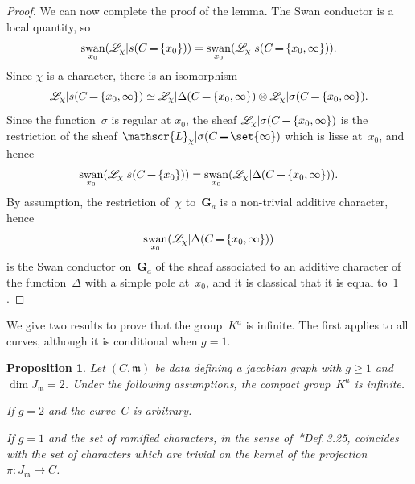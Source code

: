 \documentclass[12pt]{amsart}
\renewcommand{\geq}{\geqslant}
\numberwithin{equation}{section}
\def\setminus{\mathchoice
    {\mathbin{\vrule height .62ex width 1.61ex depth -.38ex}}%
    {\mathbin{\vrule height .62ex width 1.61ex depth -.38ex}}%
    {\mathbin{\vrule height .50ex width 0.85ex depth -.28ex}}%
    {\mathbin{\vrule height .20ex width 0.570ex depth -.24ex}}%
}
\newcommand{\Gg}{\mathbf{G}}
\newcommand{\mfm}{\mathfrak{m}}
\DeclareMathOperator{\swan}{swan}
\theoremstyle{plain}
\newtheorem{proposition}[theorem]{Proposition}
\theoremstyle{remark}
\theoremstyle{definition}
\newcommand{\mcL}{\mathscr{L}}
\renewcommand{\geq}{\geqslant}
\begin{document}
\begin{proof}
  We can now complete the proof of the lemma. The Swan conductor is a
  local quantity, so 
  \[
    \swan_{x_0}(\mcL_{\chi}|s(C\setminus \{x_0\}))=
    \swan_{x_0}(\mcL_{\chi}|s(C\setminus \{x_0,\infty\})).
  \] Since $\chi$ is a character, there is an isomorphism
  \[
    \mcL_{\chi}|s(C\setminus \{x_0,\infty\})\simeq
    \mcL_{\chi}|\Delta(C\setminus
    \{x_0,\infty\})\otimes\mcL_{\chi}|\sigma(C\setminus
    \{x_0,\infty\}).
  \] Since the function~$\sigma$ is regular at $x_0$, the sheaf
  $\mcL_{\chi}|\sigma(C\setminus \{x_0,\infty\})$ is the restriction
  of the sheaf $\mcL_{\chi}|\sigma(C\setminus \set{\infty})$ which is
  lisse at~$x_0$, and hence
  \[
    \swan_{x_0}(\mcL_{\chi}|s(C\setminus
    \{x_0\}))=\swan_{x_0}(\mcL_{\chi}|\Delta(C\setminus
    \{x_0,\infty\})).
  \] By assumption, the restriction of~$\chi$ to~$\Gg_a$ is a non-trivial
  additive character, hence
  \[
  \swan_{x_0}(\mcL_{\chi}|\Delta(C\setminus \{x_0,\infty\}))
  \] is the
  Swan conductor on~$\Gg_a$ of the sheaf associated to an additive
  character of the function~$\Delta$ with a simple pole at~$x_0$, and it
  is classical that it is equal to~$1$.
\end{proof}

We give two results to prove that the group~$K^a$ is infinite. The first
applies to all curves, although it is conditional when $g=1$.

\begin{proposition}\label{pr-infinite}
  Let $(C,\mfm)$ be data defining a jacobian graph with $g\geq 1$ and
  $\dim J_{\mfm}=2$.  Under the following assumptions, the compact
  group~$K^a$ is infinite.
  \begin{enumth}
  \item If $g=2$ and the curve~$C$ is arbitrary.
  \item If $g=1$ and the set of ramified characters, in the sense
    of~\textup{\cite{ffk}*{Def.\,3.25}}, coincides with the set of
    characters which are trivial on the kernel of the projection
    $\pi\colon J_{\mfm}\to C$.
     \end{enumth}
\end{proposition}
\end{document}
